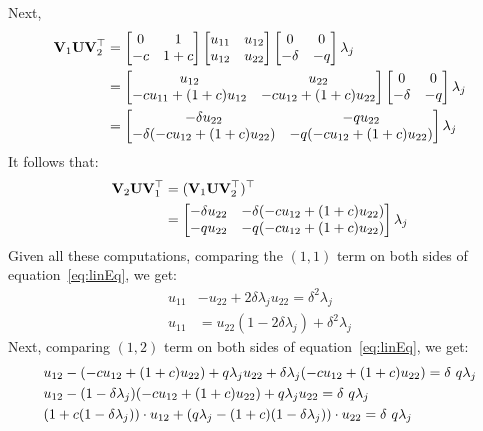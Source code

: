 Next,
\begin{align*}
\mathbf{V}_1\mathbf{U}\mathbf{V}_2^{\top}&=\begin{bmatrix}0&1\\-c&1+c\end{bmatrix}\begin{bmatrix}u_{11}&u_{12}\\u_{12}&u_{22}\end{bmatrix}\begin{bmatrix}0 &0\\-\delta&-q \end{bmatrix}\lambda_j\\
&=\begin{bmatrix}u_{12}&u_{22}\\-cu_{11}+(1+c)u_{12}&-cu_{12}+(1+c)u_{22}\end{bmatrix}\begin{bmatrix}0 &0\\-\delta&-q \end{bmatrix}\lambda_j\\
&=\begin{bmatrix}-\delta u_{22}&-q  u_{22}\\-\delta(-c u_{12}+(1+c)u_{22})&-q (-c u_{12}+(1+c)u_{22})\end{bmatrix}\lambda_j
\end{align*}
It follows that:
\begin{align*}
\mathbf{V}_2\mathbf{U}\mathbf{V}_1^{\top}&=(\mathbf{V}_1\mathbf{U}\mathbf{V}_2^{\top})^{\top}\\
&=\begin{bmatrix}-\delta u_{22}&-\delta(-c u_{12}+(1+c)u_{22})\\-q  u_{22}&-q (-c u_{12}+(1+c)u_{22})\end{bmatrix}\lambda_j
\end{align*}
Given all these computations, comparing the $(1,1)$ term on both sides of equation~\ref{eq:linEq}, we get:
\begin{align}
\label{eq:t11}
u_{11}&-u_{22}+2\delta\lambda_j u_{22}=\delta^2\lambda_j\nonumber\\
u_{11}&=u_{22}(1-2\delta\lambda_j)+\delta^2\lambda_j
\end{align}
Next, comparing $(1,2)$ term on both sides of equation~\ref{eq:linEq}, we get:
\begin{align}
\label{eq:t12}
&u_{12}-(-c u_{12}+ (1+c) u_{22}) +q  \lambda_j u_{22} + \delta\lambda_j (-c u_{12} + (1+c) u_{22})=\delta\ q \lambda_j\nonumber\\
&u_{12}-(1-\delta\lambda_j)(-c u_{12} + (1+c) u_{22})+q \lambda_ju_{22}=\delta\ q \lambda_j\nonumber\\
&(1+c(1-\delta\lambda_j))\cdot u_{12}+(q \lambda_j-(1+c)(1-\delta\lambda_j))\cdot u_{22}=\delta\ q \lambda_j
\end{align}
